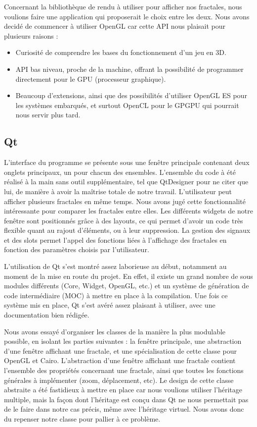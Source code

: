 \documentclass[11pt]{article}
\begin{document}
\vspace{10pt}
Concernant la bibliothèque de rendu à utiliser pour afficher nos fractales, nous
voulions faire une application qui proposerait le choix entre les deux. Nous
avons decidé de commencer à utiliser OpenGL car cette API nous plaisait pour
plusieurs raisons :
\begin{itemize}
    \item Curiosité de comprendre les bases du fonctionnement d'un jeu en 3D.
    \item API bas niveau, proche de la machine, offrant la possibilité de
        programmer directement pour le GPU (processeur graphique).
    \item Beaucoup d'extensions, ainsi que des possibilités d'utiliser OpenGL ES
        pour les systèmes embarqués, et surtout OpenCL pour le GPGPU qui
        pourrait nous servir plus tard.
\end{itemize}

\subsection{Qt}

L'interface du programme se présente sous une fenêtre principale contenant deux
onglets principaux, un pour chacun des ensembles. L'ensemble du code à été
réalisé à la main sans outil supplémentaire, tel que QtDesigner pour ne citer
que lui, de manière à avoir la maîtrise totale de notre travail. L'utilisateur
peut afficher plusieurs fractales en même temps. Nous avons jugé cette
fonctionnalité intéressante pour comparer les fractales entre elles. Les
différents widgets de notre fenêtre sont positionnés grâce à des layouts, ce qui
permet d'avoir un code très flexible quant au rajout d'éléments, ou à leur
suppression. La gestion des signaux et des slots permet l'appel des fonctions
liées à l'affichage des fractales en fonction des paramètres choisis par
l'utilisateur.

L'utilisation de Qt s'est montré assez laborieuse au début, notamment au moment
de la mise en route du projet. En effet, il existe un grand nombre de sous
modules différents (Core, Widget, OpenGL, etc.) et un système de génération de
code intermédiaire (MOC) à mettre en place à la compilation. Une fois ce système
mis en place, Qt s'est avéré assez plaisant à utiliser, avec une documentation
bien rédigée.

Nous avons essayé d'organiser les classes de la manière la plus modulable
possible, en isolant les parties suivantes : la fenêtre principale, une
abstraction d'une fenêtre affichant une fractale, et une spécialisation de cette
classe pour OpenGL et Cairo. L'abstraction d'une fenêtre affichant une fractale
contient l'ensemble des propriétés concernant une fractale, ainsi que toutes les
fonctions générales à implémenter (zoom, déplacement, etc). Le design de cette
classe abstraite a été fastidieux à mettre en place car nous voulions utiliser
l'héritage multiple, mais la façon dont l'héritage est conçu dans Qt ne nous
permettait pas de le faire dans notre cas précis, même avec l'héritage virtuel.
Nous avons donc du repenser notre classe pour pallier à ce problème.
\end{document}

